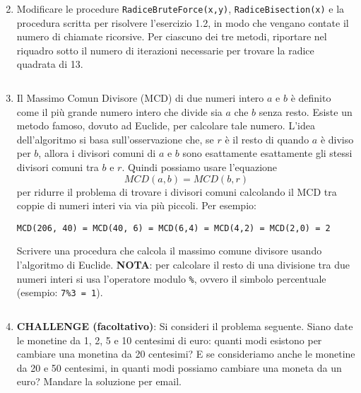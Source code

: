 \documentclass[11pt,a4]{article}
\newcommand{\mybox}[2]{$\quad$\fbox{
\begin{minipage}{#1cm}
\hfill\vspace{#2cm}
\end{minipage}
}}
\begin{document}
\begin{enumerate}
\mybox{15}{4.5}

\item Modificare le procedure {\tt RadiceBruteForce(x,y)}, {\tt RadiceBisection(x)} e la procedura
scritta per risolvere l'esercizio 1.2, in modo che vengano contate il numero di chiamate ricorsive.
Per ciascuno dei tre metodi, riportare nel riquadro sotto il numero di iterazioni necessarie
per trovare la radice quadrata di 13.

\mybox{15}{1.0}

\item Il Massimo Comun Divisore (MCD) di due numeri intero $a$ e $b$ è definito come 
il più grande numero intero che divide sia $a$ che $b$ senza resto. 
Esiste un metodo famoso, dovuto ad Euclide, per calcolare tale numero.
L'idea dell'algoritmo si basa sull'osservazione che, se $r$ è il resto di quando $a$ è diviso per $b$, 
allora i divisori comuni di $a$ e $b$ sono esattamente esattamente gli stessi divisori comuni tra $b$ e $r$. 
Quindi possiamo usare l'equazione $$MCD(a,b) = MCD(b,r)$$ per ridurre il problema di 
trovare i divisori comuni calcolando il MCD tra coppie di numeri interi via via più piccoli. Per esempio:

\begin{verbatim}
MCD(206, 40) = MCD(40, 6) = MCD(6,4) = MCD(4,2) = MCD(2,0) = 2
\end{verbatim}

Scrivere una procedura che calcola il massimo comune divisore usando l'algoritmo di Euclide.
{\bf NOTA}: per calcolare il resto di una divisione tra due numeri interi si usa l'operatore modulo {\tt \%}, 
ovvero il simbolo percentuale (esempio: {\tt 7\%3 = 1}).

\mybox{15}{3.5}

\item {\bf CHALLENGE (facoltativo)}: Si consideri il problema seguente. Siano date le monetine
da 1, 2, 5 e 10 centesimi di euro: quanti modi esistono per cambiare una monetina da 20 centesimi?
E se consideriamo anche le monetine da 20 e 50 centesimi, 
in quanti modi possiamo cambiare una moneta da un euro? Mandare la soluzione per email.

\end{enumerate}
\end{document}
